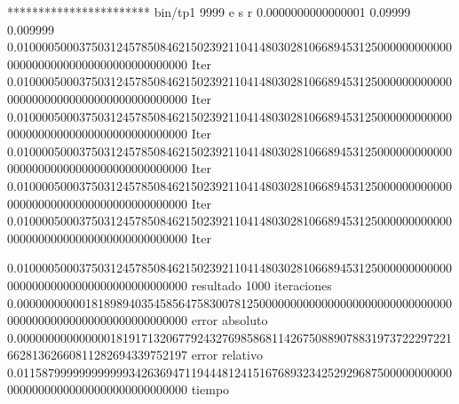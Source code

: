 *********************** bin/tp1 9999 e s r 0.0000000000000001 0.09999 0.009999
0.010000500037503124578508462150239211041480302810668945312500000000000000000000000000000000000000000 Iter
0.010000500037503124578508462150239211041480302810668945312500000000000000000000000000000000000000000 Iter
0.010000500037503124578508462150239211041480302810668945312500000000000000000000000000000000000000000 Iter
0.010000500037503124578508462150239211041480302810668945312500000000000000000000000000000000000000000 Iter
0.010000500037503124578508462150239211041480302810668945312500000000000000000000000000000000000000000 Iter
0.010000500037503124578508462150239211041480302810668945312500000000000000000000000000000000000000000 Iter

0.010000500037503124578508462150239211041480302810668945312500000000000000000000000000000000000000000 resultado
1000 iteraciones
0.000000000001818989403545856475830078125000000000000000000000000000000000000000000000000000000000000 error absoluto
0.000000000000000181917132067792432769858681142675088907883197372229722166281362660811282694339752197 error relativo
0.011587999999999999342636947119444812415167689323425292968750000000000000000000000000000000000000000 tiempo
